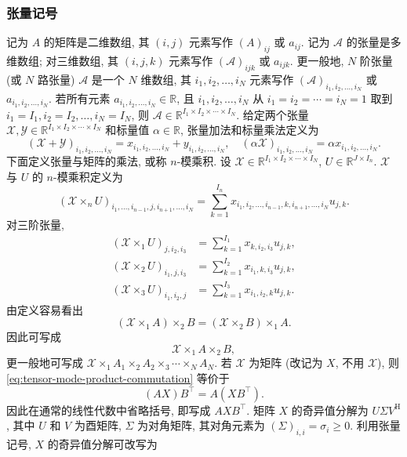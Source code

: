 \subsubsection{{张量记号}}\label{subsec:tensor-notations}
{记为 $A$ 的矩阵是二维数组, 其 $(i,j)$ 元素写作 $(A)_{ij}$ 或 $a_{ij}$. 记为 $\mathcal{A}$ 的张量是多维数组; 对三维数组, 其 $(i,j,k)$ 元素写作 $(\mathcal{A})_{ijk}$ 或 $a_{ijk}$. 更一般地, $N$ 阶张量 (或 $N$ 路张量) $\mathcal{A}$ 是一个 $N$ 维数组, 其 $i_1,i_2,\ldots,i_N$ 元素写作 $(\mathcal{A})_{i_1,i_2,\ldots,i_N}$ 或 $a_{i_1,i_2,\ldots,i_N}$. 若所有元素 $a_{i_1,i_2,\ldots,i_N}\in\mathbb{R}$, 且 $i_1,i_2,\ldots,i_N$ 从 $i_1=i_2=\cdots=i_N=1$ 取到 $i_1=I_1,i_2=I_2,\ldots,i_N=I_N$, 则 $\mathcal{A}\in\mathbb{R}^{I_1\times I_2\times\cdots\times I_N}$.}
{给定两个张量 $\mathcal{X},\mathcal{Y}\in\mathbb{R}^{I_1\times I_2\times\cdots\times I_N}$ 和标量值 $\alpha\in\mathbb{R}$, 张量加法和标量乘法定义为}
\[(\mathcal{X}+\mathcal{Y})_{i_1,i_2,\ldots,i_N}=x_{i_1,i_2,\ldots,i_N}+y_{i_1,i_2,\ldots,i_N},\quad
(\alpha\mathcal{X})_{i_1,i_2,\ldots,i_N}=\alpha x_{i_1,i_2,\ldots,i_N}.\]
{下面定义张量与矩阵的乘法, 或称 $n$-模乘积. 设 $\mathcal{X}\in\mathbb{R}^{I_1\times I_2\times\cdots\times I_N}$, $U\in\mathbb{R}^{J\times I_n}$. $\mathcal{X}$ 与 $U$ 的 $n$-模乘积定义为}
\[(\mathcal{X}\times_nU)_{i_1,\ldots,i_{n-1},j,i_{n+1},\ldots,i_N}
=\sum_{k=1}^{I_n}x_{i_1,i_2,\ldots,i_{n-1},k,i_{n+1},\ldots,i_N}u_{j,k}.\]
{对三阶张量,}
\[\begin{aligned}
(\mathcal{X}\times_1U)_{j,i_2,i_3}&=\sum_{k=1}^{I_1}x_{k,i_2,i_3}u_{j,k},\\
(\mathcal{X}\times_2U)_{i_1,j,i_3}&=\sum_{k=1}^{I_2}x_{i_1,k,i_3}u_{j,k},\\
(\mathcal{X}\times_3U)_{i_1,i_2,j}&=\sum_{k=1}^{I_3}x_{i_1,i_2,k}u_{j,k}.
\end{aligned}\]
{由定义容易看出}
\begin{equation}\label{eq:tensor-mode-product-commutation}
(\mathcal{X}\times_1A)\times_2B=(\mathcal{X}\times_2B)\times_1A.
\end{equation}
{因此可写成}
\[\mathcal{X}\times_1A\times_2B,\]
{更一般地可写成 $\mathcal{X}\times_1A_1\times_2A_2\times_3\cdots\times_NA_N$. 若 $\mathcal{X}$ 为矩阵 (改记为 $X$, 不用 $\mathcal{X}$), 则 \eqref{eq:tensor-mode-product-commutation} 等价于}
\[(AX)B^{\top}=A(XB^{\top}).\]
{\leavevmode{}\label{idx:chapter-02-section-05:tensor-svd-and-contractions}因此在通常的线性代数中省略括号, 即写成 $AXB^{\top}$. 矩阵 $X$ 的奇异值分解为 $U\Sigma V^{\mathrm H}$, 其中 $U$ 和 $V$ 为酉矩阵, $\Sigma$ 为对角矩阵, 其对角元素为 $(\Sigma)_{i,i}=\sigma_i\ge0$. 利用张量记号, $X$ 的奇异值分解可改写为}
